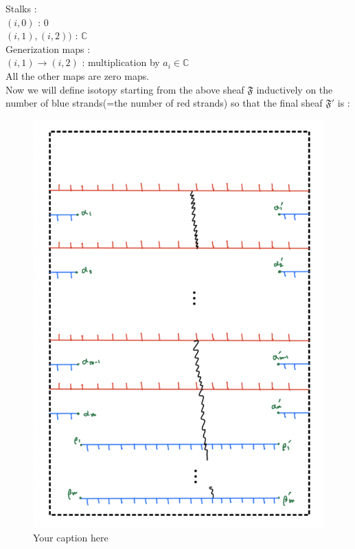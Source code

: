 Stalks : \\
$(i,0)$ : $0$\\
$(i,1),(i,2))$ : $\mathbb{C}$\\

Generization maps :\\
$(i,1)\rightarrow (i,2)$ :  multiplication by $a_i \in \mathbb{C}$\\
All the other maps are zero maps.\\

Now we will define isotopy starting from the above sheaf $\mathfrak{F}$ inductively on the number of blue strands(=the number of red strands) so that the final sheaf $\mathfrak{F}'$ is :

\begin{figure}[H] %
    \centering
    \includegraphics[width=\linewidth]{diagrams/lemma7/2.png} %
    \caption{Your caption here}
    \label{fig:your-label}
\end{figure}


